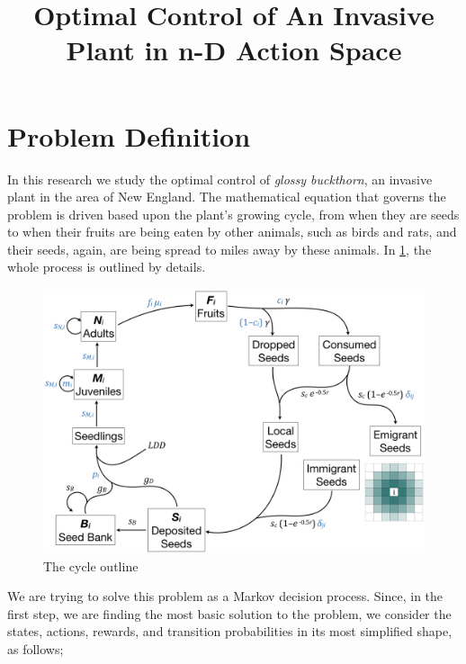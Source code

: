 \documentclass{article}
\title{Optimal Control of An Invasive Plant in n-D Action Space}
\theoremstyle{remark}
\theoremstyle{remark}
\theoremstyle{remark}
\theoremstyle{remark}
\theoremstyle{remark}
\theoremstyle{remark}
\begin{document}
\maketitle

\section{Problem Definition}
In this research we study the optimal control of \emph{glossy buckthorn}, an invasive plant in the area of New England. The mathematical equation that governs the problem is driven based upon the plant's growing cycle, from when they are seeds to when their fruits are being eaten by other animals, such as birds and rats, and their seeds, again, are being spread to miles away by these animals. In \cref{fig:outline}, the whole process is outlined by details.

\begin{figure}
\centering
\includegraphics[scale=.2]{model_outline.jpeg}
\caption{The cycle outline} \label{fig:outline}
\end{figure}

We are trying to solve this problem as a Markov decision process. Since, in the first step, we are finding the most basic solution to the problem, we consider the states, actions, rewards, and transition probabilities in its most simplified shape, as follows;
\end{document}
